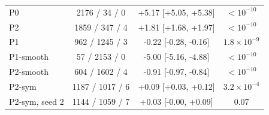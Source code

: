 \begin{tabular}{@{}l ccc@{}}
P0 & 2176 / 34 / 0 & +5.17 [+5.05, +5.38] & $<10^{-10}$ \\
P2 & 1859 / 347 / 4 & +1.81 [+1.68, +1.97] & $<10^{-10}$ \\
P1 & 962 / 1245 / 3 & -0.22 [-0.28, -0.16] & $1.8\times10^{-9}$ \\
P1-smooth & 57 / 2153 / 0 & -5.00 [-5.16, -4.88] & $<10^{-10}$ \\
P2-smooth & 604 / 1602 / 4 & -0.91 [-0.97, -0.84] & $<10^{-10}$ \\
P2-sym & 1187 / 1017 / 6 & +0.09 [+0.03, +0.12] & $3.2\times10^{-4}$ \\
\quad P2-sym, seed 2 & 1144 / 1059 / 7 & +0.03 [-0.00, +0.09] & 0.07 \\
\bottomrule
\end{tabular}
